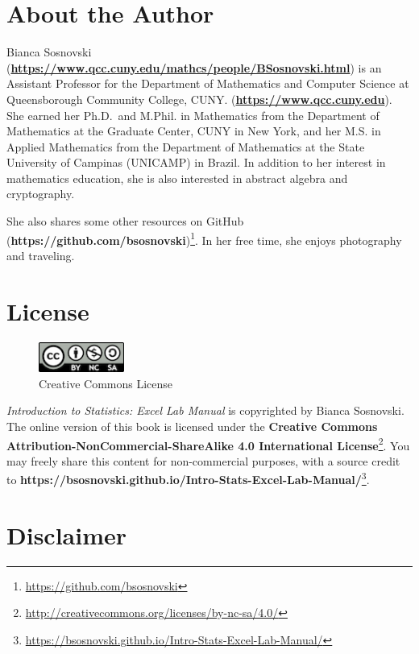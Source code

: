 \documentclass[
  12pt,
  letterpaper,
]{book}
\DeclareRobustCommand{\href}[2]{#2\footnote{\url{#1}}}
\begin{document}
\hypertarget{about-the-author}{%
\section*{About the Author}\label{about-the-author}}

Bianca Sosnovski (\textbf{\url{https://www.qcc.cuny.edu/mathcs/people/BSosnovski.html}}) is an Assistant Professor for the Department of Mathematics and Computer Science at Queensborough Community College, CUNY. (\textbf{\url{https://www.qcc.cuny.edu}}). She earned her Ph.D.~and M.Phil. in Mathematics from the Department of Mathematics at the Graduate Center, CUNY in New York, and her M.S. in Applied Mathematics from the Department of Mathematics at the State University of Campinas (UNICAMP) in Brazil. In addition to her interest in mathematics education, she is also interested in abstract algebra and cryptography.

She also shares some other resources on GitHub \href{https://github.com/bsosnovski}{(\textbf{https://github.com/bsosnovski})}. In her free time, she enjoys photography and traveling.

\hypertarget{license}{%
\section*{License}\label{license}}

\begin{figure}
\centering
\includegraphics[width=0.25\textwidth,height=\textheight]{images/CC-BY-NC-SA.png}
\caption{Creative Commons License}
\end{figure}

\emph{Introduction to Statistics: Excel Lab Manual} is copyrighted by Bianca Sosnovski. The online version of this book is licensed under the \href{http://creativecommons.org/licenses/by-nc-sa/4.0/}{\textbf{Creative Commons Attribution-NonCommercial-ShareAlike 4.0 International License}}. You may freely share this content for non-commercial purposes, with a source credit to \href{https://bsosnovski.github.io/Intro-Stats-Excel-Lab-Manual/}{\textbf{https://bsosnovski.github.io/Intro-Stats-Excel-Lab-Manual/}}.

\hypertarget{disclaimer}{%
\section*{Disclaimer}\label{disclaimer}}
\end{document}
